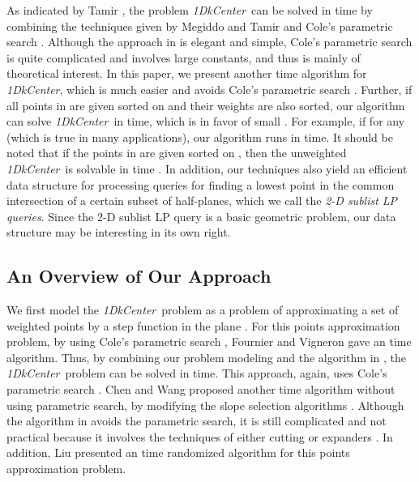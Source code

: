 \documentclass{llncs}
\def\problem{{\it 1DkCenter}}
\begin{document}
As indicated by Tamir \cite{ref:TamirPe14},
 the problem \problem\ can be solved in  time by combining the techniques given by Megiddo and Tamir \cite{ref:MegiddoNe83} and Cole's parametric search  \cite{ref:ColeSl87}.
Although the approach in \cite{ref:MegiddoNe83} is elegant and simple, Cole's parametric search \cite{ref:ColeSl87} is quite complicated and involves large constants, and thus is mainly of theoretical interest.
In this paper, we present another  time algorithm for \problem, which is much easier and avoids Cole's parametric search \cite{ref:ColeSl87}.
Further, if all points in  are given sorted on  and their weights are
also sorted, our algorithm can solve \problem\ in
 time, which is in favor
of small .
For example, if  for any  (which is true
in many applications), our algorithm runs in  time.
It should be noted that if the points in  are given sorted on , then the unweighted \problem\ is solvable in  time \cite{ref:TamirPe14}.
In addition, our techniques also yield an efficient data structure for
processing queries for finding a lowest point in the common
intersection of a certain subset of half-planes, which we call the
{\em 2-D sublist LP queries}. Since the 2-D sublist LP query is a basic
geometric problem, our data structure may be interesting in its own right.









\subsection{An Overview of Our Approach}

We first model the \problem\ problem as a problem of approximating a set of
weighted points by a step function in the plane \cite{ref:ChenA13,ref:ChenAp13,ref:FournierA13,ref:LiuA10}.
For this points approximation problem, by using Cole's parametric search \cite{ref:ColeSl87}, Fournier and
Vigneron \cite{ref:FournierA13} gave an  time
algorithm. Thus, by combining
our problem modeling and the algorithm in \cite{ref:FournierA13}, the
\problem\ problem can be solved in  time. This approach, again, uses Cole's parametric search \cite{ref:ColeSl87}. Chen and Wang \cite{ref:ChenA13} proposed another  time algorithm without using parametric search, by modifying the slope selection algorithms \cite{ref:BronnimannOp98,ref:KatzOp93}. Although the algorithm in \cite{ref:ChenA13} avoids the parametric search, it is still complicated and not practical because it involves the techniques of either cutting \cite{ref:BronnimannOp98} or expanders \cite{ref:KatzOp93}. In addition, Liu \cite{ref:LiuA10} presented an  time randomized algorithm for this points approximation problem.
\end{document}
